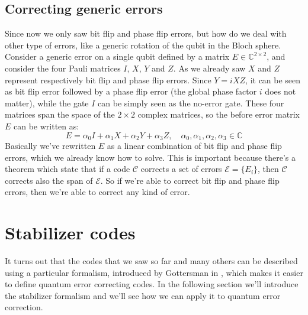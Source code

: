 \documentclass{article}
\begin{document}
	\subsection{Correcting generic errors}
	Since now we only saw bit flip and phase flip errors, but how do we deal with other type of errors, like a generic rotation of the qubit in the Bloch sphere. Consider a generic error on a single qubit defined by a matrix $E \in \mathbb{C}^{2 \times 2}$, and consider the four Pauli matrices $I$, $X$, $Y$ and $Z$. As we already saw $X$ and $Z$ represent respectively bit flip and phase flip errors. Since $Y = iXZ$, it can be seen as bit flip error followed by a phase flip error (the global phase factor $i$ does not matter), while the gate $I$ can be simply seen as the no-error gate. These four matrices span the space of the $2 \times 2$ complex matrices, so the before error matrix $E$ can be written as:
	\[ E = \alpha_0I + \alpha_1X + \alpha_2Y + \alpha_3Z, \quad \alpha_0, \alpha_1, \alpha_2, \alpha_3 \in \mathbb{C}\]
	Basically we've rewritten $E$ as a linear combination of bit flip and phase flip errors, which we already know how to solve. This is important because there's a theorem which state that if a code $\mathcal{C}$ corrects a set of errors $\mathcal{E} = \{E_i\}$, then $\mathcal{C}$ corrects also the span of $\mathcal{E}$. So if we're able to correct bit flip and phase flip errors, then we're able to correct any kind of error.
	
	\section{Stabilizer codes}
	It turns out that the codes that we saw so far and many others can be described using a particular formalism, introduced by Gottersman in \cite{Gottesman1997StabilizerCA}, which makes it easier to define quantum error correcting codes. In the following section we'll introduce the stabilizer formalism and we'll see how we can apply it to quantum error correction.
	
\end{document}
